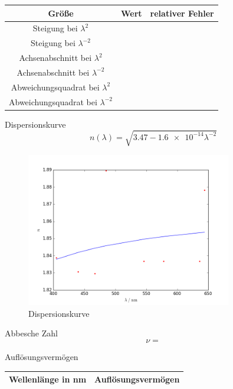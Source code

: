 \begin{table}[h!]
	\centering
	\begin{tabular}{c|c|c}
		Größe & Wert & relativer Fehler \\
		\hline
		Steigung bei $\lambda^2$ &  & 
		\\
		Steigung bei $\lambda^{-2}$ &  &  \\
		Achsenabschnitt bei $\lambda^2$ &  & 
		\\
		Achsenabschnitt bei $\lambda^{-2}$ &  &  \\
		\hline
		Abweichungsquadrat bei $\lambda^2$ &  & \\
		Abweichungsquadrat bei $\lambda^{-2}$ &  & \\
	\end{tabular}
\end{table}
Dispersionskurve
\[ n(\lambda) = \sqrt{3.47 - \SI{1.6e-14}\lambda^{-2}} \]
\begin{figure}[h!]
	\centering
	\includegraphics[width=0.8\textwidth]{Dispersionskurve.png}
	\caption{Dispersionskurve}
	\label{fig:DispKurve}
\end{figure}


Abbesche Zahl \[ \nu =  \]

Auflösungsvermögen
\begin{table}
	\centering
	\begin{tabular}{c|c}
		Wellenlänge in \si{\nano\meter} & Auflösungsvermögen \\
		\hline
		
	\end{tabular}
\end{table}

